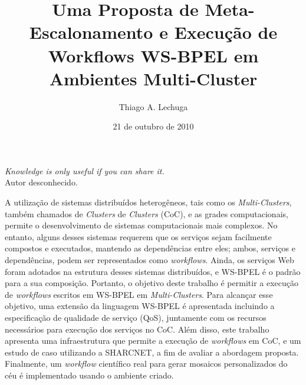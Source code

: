 \documentclass[12pt]{report} %
\title{Uma Proposta de Meta-Escalonamento e Execução de Workflows WS-BPEL em Ambientes Multi-Cluster}
\author{Thiago A. Lechuga}
\date{21 de outubro de 2010} %
\begin{document}
%
\copyrightfalse %
%
\finalversiontrue %
%
\tablespagetrue %
%
\figurespagetrue %

\listingspagetrue %
%
\beforepreface


\prefacesection{}
  \vfill
  \begin{flushright}    
    \textit{Knowledge is only useful if you can share it.}\\
    Autor desconhecido.
  \end{flushright}

    
    A utilização de sistemas distribuídos heterogêneos, tais como os \textit{Multi-Clusters}, também chamados de \textit{Clusters} de \textit{Clusters} (CoC), e as grades computacionais, permite o desenvolvimento de sistemas computacionais mais complexos.
    No entanto, alguns desses sistemas requerem que os serviços sejam facilmente compostos e executados, mantendo as dependências entre eles;
    ambos, serviços e dependências, podem ser representados como \textit{workflows}.
    Ainda, os serviços Web foram adotados na estrutura desses sistemas distribuídos, e WS-BPEL é o padrão para a sua composição.
    Portanto, o objetivo deste trabalho é permitir a execução de \textit{workflows} escritos em WS-BPEL em \textit{Multi-Clusters}.
    Para alcançar esse objetivo, uma extensão da linguagem WS-BPEL é apresentada incluindo a especificação de qualidade de serviço (QoS), juntamente com os recursos necessários para execução dos serviços no CoC.
    Além disso, este trabalho apresenta uma infraestrutura que permite a execução de \textit{workflows} em CoC, e um estudo de caso utilizando a SHARCNET, a fim de avaliar a abordagem proposta.
    Finalmente, um \textit{workflow} científico real para gerar mosaicos personalizados do céu é implementado usando o ambiente criado.      
\end{document}
